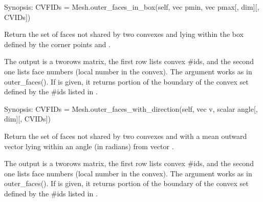 \documentclass[a4paper,11pt,english]{sphinxmanual}
\begin{document}
\begin{fulllineitems}
\begin{fulllineitems}
\end{fulllineitems}


\begin{fulllineitems}
\label{\detokenize{python/cmdref_Mesh:getfem.Mesh.outer_faces_in_box}}
Synopsis: CVFIDs = Mesh.outer\_faces\_in\_box(self, vec pmin, vec pmax{[}, dim{]}{[}, CVIDs{]})

Return the set of faces not shared by two convexes and lying within the box defined by the corner points  and .

The output  is a two\sphinxhyphen{}rows matrix, the first row lists convex
\#ids, and the second one lists face numbers (local number in the
convex). The argument  works as in outer\_faces().
If  is given, it returns portion of the boundary of
the convex set defined by the \#ids listed in .

\end{fulllineitems}


\begin{fulllineitems}
\label{\detokenize{python/cmdref_Mesh:getfem.Mesh.outer_faces_with_direction}}
Synopsis: CVFIDs = Mesh.outer\_faces\_with\_direction(self, vec v, scalar angle{[}, dim{]}{[}, CVIDs{]})

Return the set of faces not shared by two convexes and with a mean outward vector lying within an angle  (in radians) from vector .

The output  is a two\sphinxhyphen{}rows matrix, the first row lists convex
\#ids, and the second one lists face numbers (local number in the
convex). The argument  works as in outer\_faces().
If  is given, it returns portion of the boundary of
the convex set defined by the \#ids listed in .


\end{fulllineitems}
\end{fulllineitems}
\end{document}
